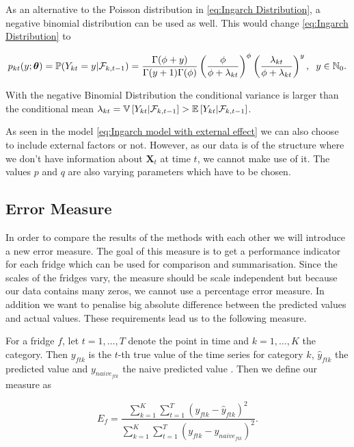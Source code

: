As an alternative to the Poisson distribution in \ref{eq:Ingarch Distribution}, a negative binomial distribution can be used as well. This would change \ref{eq:Ingarch Distribution} to 

\begin{equation}
p_{kt}(y;\bm{\theta})=\mathbb{P}(Y_{kt}=y | \mathcal{F}_{k,t-1}) = \frac{\Gamma(\phi+y)}{\Gamma(y+1)\Gamma(\phi)}\left(\frac{\phi}{\phi+\lambda_{kt}}\right)^\phi\left(\frac{\lambda_{kt}}{\phi+\lambda_{kt}}\right)^y, \hspace{0.2cm} y \in \mathbb{N}_0.
\label{eq:Ingarch negbinom Distribution}
\end{equation}

With the negative Binomial Distribution the conditional variance is larger than the conditional mean $\lambda_{kt} = \mathbb{V}\left[Y_{kt} | \mathcal{F}_{k,t-1}\right] > \mathbb{E}\left[Y_{kt} | \mathcal{F}_{k,t-1}\right]$.

As seen in the model \ref{eq:Ingarch model with external effect} we can also choose to include external factors or not. However, as our data is of the structure where we don't have information about $\bm{X}_t$ at time $t$, we cannot make use of it. The values $p$ and $q$ are also varying parameters which have to be chosen. 


\subsection{Error Measure}
\label{sec: Error Measure}

In order to compare the results of the methods with each other we will introduce a new error measure. The goal of this measure is to get a performance indicator for each fridge which can be used for comparison and summarisation. Since the scales of the fridges vary, the measure should be scale independent but because our data contains many zeros, we cannot use a percentage error measure. In addition we want to penalise big absolute difference between the predicted values and actual values. These requirements lead us to the following measure.

For a fridge $f$, let $t = 1,\ldots,T$ denote the point in time and $k=1,\ldots,K$ the category. Then $y_{ftk}$ is the $t$-th true value of the time series for category $k$, $\hat{y}_{ftk}$ the predicted value and $y_{naive_{ftk}}$ the naive predicted value . Then we define our measure as

\begin{equation}
E_f=\frac{\sum_{k=1}^{K}\sum_{t=1}^T(y_{ftk}-\hat{y}_{ftk})^2}{\sum_{k=1}^{K}\sum_{t=1}^T(y_{ftk}-y_{naive_{ftk}})^2}.
\label{eq: Error Measure}
\end{equation}

